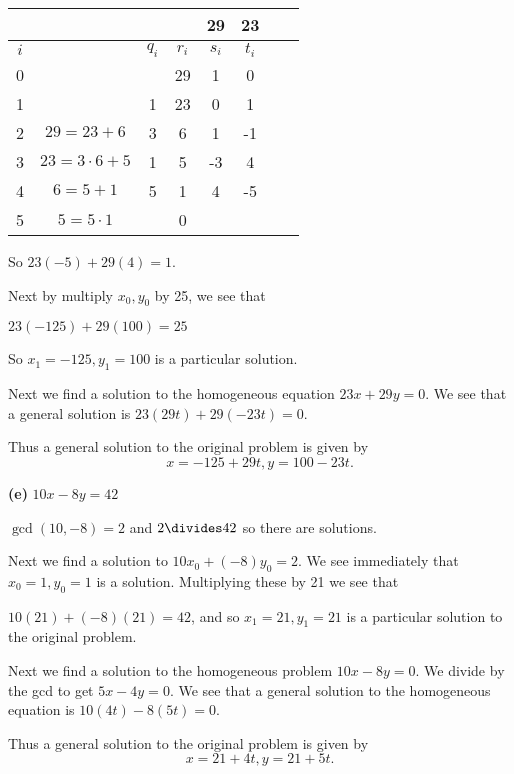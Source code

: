 \documentclass[oneside,12pt]{amsart}
\begin{document}
\begin{tabular}{|c|c|c|c|c|c|c|c|}
\hline
\quad & \quad               & \quad   & \quad & 29     & 23   \\ \hline
$i$   & \quad               & $q_{i}$ & $r_i$ & $s_i$  & $t_i$ \\ \hline\hline
0     & \quad               & \quad   & 29    &  1     & 0     \\ \hline
1     & \quad               & 1       & 23    &  0     & 1     \\ \hline
2     & $29 = 23 + 6$       & 3       & 6     &  1     &-1     \\ \hline
3     & $23 = 3\cdot 6 + 5$ & 1       & 5     & -3     & 4     \\ \hline
4     & $ 6 = 5 + 1$        & 5       & 1     &  4     &-5     \\ \hline
5     & $ 5 = 5\cdot 1 $    &         & 0     &        &       \\ \hline
\end{tabular}

So $23(-5) + 29(4) = 1.$

Next by multiply $x_0, y_0$ by 25, we see that

$23(-125) + 29(100) = 25$

So $x_1=-125, y_1=100$ is a particular solution.

Next we find a solution to the homogeneous equation $23x+29y = 0$.
We see that a general solution is $23(29t) + 29(-23t)=0$.

Thus a general solution to the original problem is given by
$$x=-125+29t, y=100-23t.$$

\bigskip

\textbf{(e)} $10x - 8y = 42$

$\gcd(10,-8) = 2$ and $2\divides 42$ so there are solutions.

Next we find a solution to $10x_0 + (-8)y_0 = 2$. We see immediately
that $x_0=1, y_0=1$ is a solution. Multiplying these by 21 we see that

$10(21)+(-8)(21) = 42$, and so $x_1=21,y_1=21$ is a particular solution
to the original problem.

Next we find a solution to the homogeneous problem $10x - 8y = 0$.
We divide by the gcd to get $5x - 4y = 0$. We see that a general solution
to the homogeneous equation is $10(4t) - 8(5t) = 0$.

Thus a general solution to the original problem is given by
$$x = 21+4t, y=21+5t.$$

\bigskip
\end{document}
